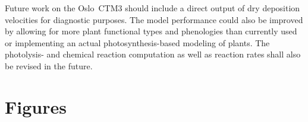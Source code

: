 \documentclass[gmd, manuscript]{copernicus}
\begin{document}
Future work on the Oslo~CTM3 should include a direct output of dry deposition velocities for diagnostic purposes. The model performance could also be improved by allowing for more plant functional types and phenologies than currently used or implementing an actual photosynthesis-based modeling of plants. The photolysis- and chemical reaction computation as well as reaction rates shall also be revised in the future.











\appendix
\section{Figures}    %
\end{document}
